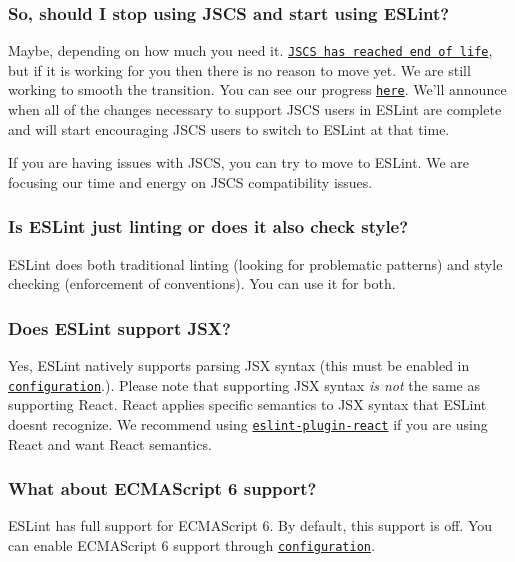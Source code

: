 \subsubsection*{So, should I stop using J\+S\+CS and start using E\+S\+Lint?}

Maybe, depending on how much you need it. \href{http://eslint.org/blog/2016/07/jscs-end-of-life}{\tt J\+S\+CS has reached end of life}, but if it is working for you then there is no reason to move yet. We are still working to smooth the transition. You can see our progress \href{https://github.com/eslint/eslint/milestones/JSCS%20Compatibility}{\tt here}. We’ll announce when all of the changes necessary to support J\+S\+CS users in E\+S\+Lint are complete and will start encouraging J\+S\+CS users to switch to E\+S\+Lint at that time.

If you are having issues with J\+S\+CS, you can try to move to E\+S\+Lint. We are focusing our time and energy on J\+S\+CS compatibility issues.

\subsubsection*{Is E\+S\+Lint just linting or does it also check style?}

E\+S\+Lint does both traditional linting (looking for problematic patterns) and style checking (enforcement of conventions). You can use it for both.

\subsubsection*{Does E\+S\+Lint support J\+SX?}

Yes, E\+S\+Lint natively supports parsing J\+SX syntax (this must be enabled in \href{http://eslint.org/docs/user-guide/configuring}{\tt configuration}.). Please note that supporting J\+SX syntax {\itshape is not} the same as supporting React. React applies specific semantics to J\+SX syntax that E\+S\+Lint doesn\textquotesingle{}t recognize. We recommend using \href{https://www.npmjs.com/package/eslint-plugin-react}{\tt eslint-\/plugin-\/react} if you are using React and want React semantics.

\subsubsection*{What about E\+C\+M\+A\+Script 6 support?}

E\+S\+Lint has full support for E\+C\+M\+A\+Script 6. By default, this support is off. You can enable E\+C\+M\+A\+Script 6 support through \href{http://eslint.org/docs/user-guide/configuring}{\tt configuration}.

